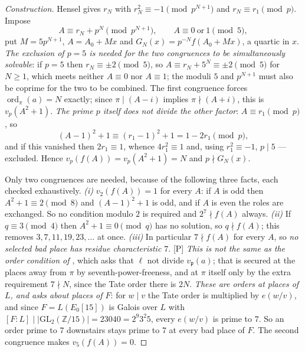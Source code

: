 \documentclass[11pt]{article}
\theoremstyle{plain}
\theoremstyle{definition}
\newcommand{\ord}{\operatorname{ord}}
\begin{document}
\begin{proof}[Construction]
Hensel gives $r_N$ with $r_N^2\equiv-1\pmod{p^{N+1}}$ and $r_N\equiv r_1\pmod p$.
Impose
\[
 A\equiv r_N+p^{N}\pmod{p^{N+1}},\qquad A\equiv0\ \text{or}\ 1\pmod5,
\]
put $M=5p^{N+1}$, $A=A_0+Mx$ and $G_N(x)=p^{-N}f(A_0+Mx)$, a quartic in $x$.  \emph{The
exclusion of $p=5$ is needed for the two congruences to be simultaneously solvable}: if
$p=5$ then $r_N\equiv\pm2\pmod5$, so $A\equiv r_N+5^{N}\equiv\pm2\pmod5$ for $N\ge1$,
which meets neither $A\equiv0$ nor $A\equiv1$; the moduli $5$ and $p^{N+1}$ must also be
coprime for the two to be combined.  The
first congruence forces $\ord_\pi(a)=N$ exactly; since $\pi\mid(A-i)$ implies
$\pi\nmid(A+i)$, this is $v_p(A^2+1)$.  \emph{The prime $p$ itself does not divide the
other factor}: $A\equiv r_1\pmod p$, so
\[
 (A-1)^2+1\equiv(r_1-1)^2+1=1-2r_1\pmod p ,
\]
and if this vanished then $2r_1\equiv1$, whence $4r_1^2\equiv1$ and, using
$r_1^2\equiv-1$, $p\mid5$ --- excluded.  Hence $v_p(f(A))=v_p(A^2+1)=N$ and
$p\nmid G_N(x)$.

Only two congruences are needed, because of the following three facts, each checked
exhaustively.  \emph{(i)} $v_2(f(A))=1$ for every $A$: if $A$ is odd then
$A^2+1\equiv2\pmod 8$ and $(A-1)^2+1$ is odd, and if $A$ is even the roles are
exchanged.  So no condition modulo $2$ is required and $2^7\nmid f(A)$ always.
\emph{(ii)} If $q\equiv3\pmod4$ then $A^2+1\equiv0\pmod q$ has no solution, so
$q\nmid f(A)$; this removes $3,7,11,19,23,\dots$ at once.  \emph{(iii)} In particular $7\nmid f(A)$ for every $A$, so
\emph{no selected bad place has residue characteristic $7$}.  \textup{[P]}
\emph{This is not the same as the order condition of \cite[Def.~3.1(c)]{IUT1}}, which
asks that $\ell$ not divide $v_{\mathfrak p}(a)$; that is secured at the places away
from $\pi$ by seventh-power-freeness, and at $\pi$ itself only by the extra requirement
$7\nmid N$, since the Tate order there is $2N$.  \emph{These are orders at places of
$L$, and \cite[Def.~3.1(c)]{IUT1} asks about places of $F$}: for $w\mid v$ the Tate
order is multiplied by $e(w/v)$, and since $F=L(E_0[15])$ is Galois over $L$ with
$[F:L]\mid|\mathrm{GL}_2(\mathbb Z/15)|=23040=2^{9}3^{2}5$, every $e(w/v)$ is prime to
$7$.  So an order prime to $7$ downstairs stays prime to $7$ at every bad place of $F$.  The second congruence makes
$v_5(f(A))=0$.


\end{proof}
\end{document}
